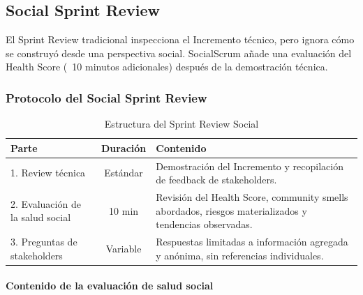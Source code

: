 \subsection{Social Sprint Review}

El Sprint Review tradicional inspecciona el Incremento técnico, pero ignora cómo se construyó desde una perspectiva social. SocialScrum añade una evaluación del Health Score (~10 minutos adicionales) después de la demostración técnica.

\subsubsection{Protocolo del Social Sprint Review}

\begin{table}[h]
    \centering
    \small
    \begin{tabularx}{\textwidth}{|l|c|X|}
        \hline
        \textbf{Parte} & \textbf{Duración}                                                                                      & \textbf{Contenido} \\
        \hline
        1. Review técnica
                       & Estándar
                       & Demostración del Incremento y recopilación de feedback de stakeholders.                                                     \\
        \hline
        2. Evaluación de la salud social
                       & 10 min
                       & Revisión del Health Score, community smells abordados, riesgos materializados y tendencias observadas.                      \\
        \hline
        3. Preguntas de stakeholders
                       & Variable
                       & Respuestas limitadas a información agregada y anónima, sin referencias individuales.                                        \\
        \hline
    \end{tabularx}
    \caption{Estructura del Sprint Review Social}
    \label{tab:review-social-estructura}
\end{table}

\FloatBarrier

\paragraph{Contenido de la evaluación de salud social}

